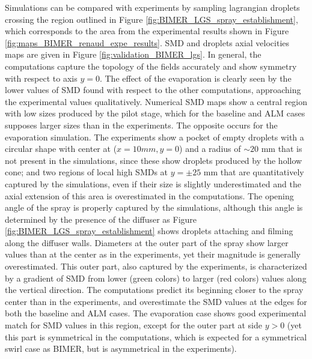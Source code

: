 Simulations can be compared with experiments by sampling lagrangian droplets crossing the region outlined in Figure \ref{fig:BIMER_LGS_spray_establishment}, which corresponds to the area from the experimental results shown in Figure \ref{fig:maps_BIMER_renaud_expe_results}. SMD and droplets axial velocities maps are given in Figure \ref{fig:validation_BIMER_lgs}. In general, the computations capture the topology of the fields accurately and show symmetry with respect to axis $y = 0$. The effect of the evaporation is clearly seen by the lower values of SMD found with respect to the other computations, approaching the experimental values qualitatively. Numerical SMD maps show a central region with low sizes produced by the pilot stage, which for the baseline and ALM cases supposes larger sizes than in the experiments. The opposite occurs for the evaporation simulation. The experiments show a pocket of empty droplets with a circular shape with center at ($x = 10 mm, y = 0$) and a radius of $\sim 20$ mm that is not present in the simulations, since these show droplets produced by the hollow cone; and two regions of local high SMDs at $y = \pm 25$ mm that are quantitatively captured by the simulations, even if their size is slightly underestimated and the axial extension of this area is overestimated in the computations. The opening angle of the spray is properly captured by the simulations, although this angle is determined by the presence of the diffuser as Figure \ref{fig:BIMER_LGS_spray_establishment} shows droplets attaching and filming along the diffuser walls. Diameters at the outer part of the spray show larger values than at the center as in the experiments, yet their magnitude is generally overestimated. This outer part, also captured by the experiments, is characterized by a gradient of SMD from lower (green colors) to larger (red colors) values along the vertical direction. The computations predict its beginning closer to the spray center than in the experiments, and overestimate the SMD values at the edges for both the baseline and ALM cases. The evaporation case shows good experimental match for SMD values in this region, except for the outer part at side $y > 0$ (yet this part is symmetrical in the computations, which is expected for a symmetrical swirl case as BIMER, but is asymmetrical in the experiments). 



